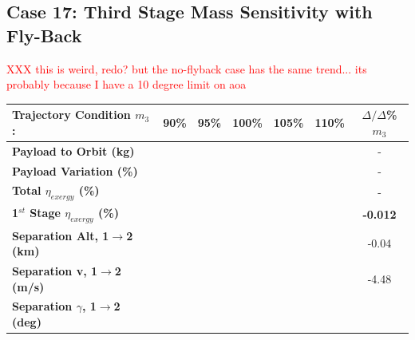 \subsection{Case 17: Third Stage Mass Sensitivity with Fly-Back}
\textcolor{red}{XXX this is weird, redo? but the no-flyback case has the same trend... its probably because I have a 10 degree limit on aoa}
\begin{table}[ht]%
	\centering
	\begin{tabular}{l c c c c c c} 
		\hline \textbf{Trajectory Condition}   \qquad  $m_{3}$:
		&90\%
		&95\%
		&100\%
		&105\%
		&110\%
		& $\Delta/\Delta$\%$m_{3}$
		\\
		\hline \textbf{Payload to Orbit (kg)}
		& \textbf{\PayloadToOrbitmThreeNinety}
		& \textbf{\PayloadToOrbitmThreeNinetyFive}
		& \textbf{\PayloadToOrbitmThreeStandard}
		& \textbf{\PayloadToOrbitmThreeOneHundredFive}
		& \textbf{\PayloadToOrbitmThreeOneHundredTen}
		& -
		\\
		\textbf{Payload Variation (\%)}
		& \PayloadVarmThreeNinety
		& \PayloadVarmThreeNinetyFive
		& \PayloadVarmThreeStandard
		& \PayloadVarmThreeOneHundredFive
		& \PayloadVarmThreeOneHundredTen
		& -
		\\
		\textbf{Total $\eta_{exergy}$ (\%)}
		& \textbf{\totalExergyEffmThreeNinety}
		& \textbf{\totalExergyEffmThreeNinetyFive}
		& \textbf{\totalExergyEffmThreeStandard}
		& \textbf{\totalExergyEffmThreeOneHundredFive}
		& \textbf{\totalExergyEffmThreeOneHundredTen}
		& -
		\\
		\hline 
		\textbf{1$^{st}$ Stage $\eta_{exergy}$ (\%)}
		& \textbf{\firstExergyEffmThreeNinety}
		& \textbf{\firstExergyEffmThreeNinetyFive}
		& \textbf{\firstExergyEffmThreeStandard}
		& \textbf{\firstExergyEffmThreeOneHundredFive}
		& \textbf{\firstExergyEffmThreeOneHundredTen}
		& \textbf{-0.012}
		\\
		\textbf{Separation Alt, 1$\rightarrow$2 (km)}
		& \firstsecondSeparationAltmThreeNinety
		& \firstsecondSeparationAltmThreeNinetyFive
		& \firstsecondSeparationAltmThreeStandard
		& \firstsecondSeparationAltmThreeOneHundredFive
		& \firstsecondSeparationAltmThreeOneHundredTen
		&-0.04
		\\
		\textbf{Separation v, 1$\rightarrow$2 (m/s)}
		& \firstsecondSeparationvmThreeNinety
		& \firstsecondSeparationvmThreeNinetyFive
		& \firstsecondSeparationvmThreeStandard
		& \firstsecondSeparationvmThreeOneHundredFive
		& \firstsecondSeparationvmThreeOneHundredTen
		&-4.48
		\\
		\textbf{Separation $\gamma$, 1$\rightarrow$2 (deg)}

\end{tabular}
\end{table}

